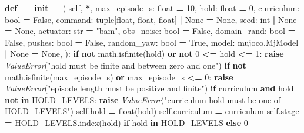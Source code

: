 \documentclass[
  american,
  11pt,
  letterpaper,
]{article}
\newenvironment{Shaded}{\begin{snugshade}}{\end{snugshade}}
\newcommand{\BuiltInTok}[1]{#1}
\newcommand{\ControlFlowTok}[1]{\textcolor[rgb]{0.13,0.29,0.53}{\textbf{#1}}}
\newcommand{\DecValTok}[1]{\textcolor[rgb]{0.00,0.00,0.81}{#1}}
\newcommand{\FunctionTok}[1]{\textcolor[rgb]{0.13,0.29,0.53}{\textbf{#1}}}
\newcommand{\KeywordTok}[1]{\textcolor[rgb]{0.13,0.29,0.53}{\textbf{#1}}}
\newcommand{\NormalTok}[1]{#1}
\newcommand{\OperatorTok}[1]{\textcolor[rgb]{0.81,0.36,0.00}{\textbf{#1}}}
\newcommand{\PreprocessorTok}[1]{\textcolor[rgb]{0.56,0.35,0.01}{\textit{#1}}}
\newcommand{\StringTok}[1]{\textcolor[rgb]{0.31,0.60,0.02}{#1}}
\newcommand{\VariableTok}[1]{\textcolor[rgb]{0.00,0.00,0.00}{#1}}
\renewenvironment{Shaded}{\par\smallskip}{\par\smallskip}
\begin{document}
\begin{Shaded}
\begin{Highlighting}[]
    \KeywordTok{def} \FunctionTok{\_\_init\_\_}\NormalTok{(}
        \VariableTok{self}\NormalTok{, }\OperatorTok{*}\NormalTok{, max\_episode\_s: }\BuiltInTok{float} \OperatorTok{=} \DecValTok{10}\NormalTok{, hold: }\BuiltInTok{float} \OperatorTok{=} \DecValTok{0}\NormalTok{,}
\NormalTok{        curriculum: }\BuiltInTok{bool} \OperatorTok{=} \VariableTok{False}\NormalTok{, command: }\BuiltInTok{tuple}\NormalTok{[}\BuiltInTok{float}\NormalTok{, }\BuiltInTok{float}\NormalTok{, }\BuiltInTok{float}\NormalTok{] }\OperatorTok{|} \VariableTok{None} \OperatorTok{=} \VariableTok{None}\NormalTok{,}
\NormalTok{        seed: }\BuiltInTok{int} \OperatorTok{|} \VariableTok{None} \OperatorTok{=} \VariableTok{None}\NormalTok{, actuator: }\BuiltInTok{str} \OperatorTok{=} \StringTok{"bam"}\NormalTok{, obs\_noise: }\BuiltInTok{bool} \OperatorTok{=} \VariableTok{False}\NormalTok{,}
\NormalTok{        domain\_rand: }\BuiltInTok{bool} \OperatorTok{=} \VariableTok{False}\NormalTok{, pushes: }\BuiltInTok{bool} \OperatorTok{=} \VariableTok{False}\NormalTok{, random\_yaw: }\BuiltInTok{bool} \OperatorTok{=} \VariableTok{True}\NormalTok{,}
\NormalTok{        model: mujoco.MjModel }\OperatorTok{|} \VariableTok{None} \OperatorTok{=} \VariableTok{None}\NormalTok{,}
\NormalTok{    ):}
        \ControlFlowTok{if} \KeywordTok{not}\NormalTok{ math.isfinite(hold) }\KeywordTok{or} \KeywordTok{not} \DecValTok{0} \OperatorTok{\textless{}=}\NormalTok{ hold }\OperatorTok{\textless{}=} \DecValTok{1}\NormalTok{:}
            \ControlFlowTok{raise} \PreprocessorTok{ValueError}\NormalTok{(}\StringTok{"hold must be finite and between zero and one"}\NormalTok{)}
        \ControlFlowTok{if} \KeywordTok{not}\NormalTok{ math.isfinite(max\_episode\_s) }\KeywordTok{or}\NormalTok{ max\_episode\_s }\OperatorTok{\textless{}=} \DecValTok{0}\NormalTok{:}
            \ControlFlowTok{raise} \PreprocessorTok{ValueError}\NormalTok{(}\StringTok{"episode length must be positive and finite"}\NormalTok{)}
        \ControlFlowTok{if}\NormalTok{ curriculum }\KeywordTok{and}\NormalTok{ hold }\KeywordTok{not} \KeywordTok{in}\NormalTok{ HOLD\_LEVELS:}
            \ControlFlowTok{raise} \PreprocessorTok{ValueError}\NormalTok{(}\StringTok{"curriculum hold must be one of HOLD\_LEVELS"}\NormalTok{)}
        \VariableTok{self}\NormalTok{.hold }\OperatorTok{=} \BuiltInTok{float}\NormalTok{(hold)}
        \VariableTok{self}\NormalTok{.curriculum }\OperatorTok{=}\NormalTok{ curriculum}
        \VariableTok{self}\NormalTok{.stage }\OperatorTok{=}\NormalTok{ HOLD\_LEVELS.index(hold) }\ControlFlowTok{if}\NormalTok{ hold }\KeywordTok{in}\NormalTok{ HOLD\_LEVELS }\ControlFlowTok{else} \DecValTok{0}

\end{Highlighting}
\end{Shaded}
\end{document}
